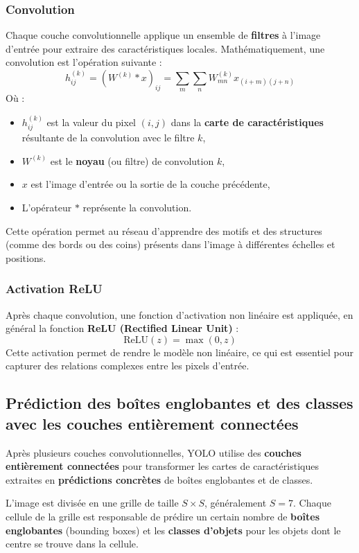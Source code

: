 \documentclass[a4paper,12pt]{article}
\begin{document}
\subsubsection{Convolution}
Chaque couche convolutionnelle applique un ensemble de \textbf{filtres} à l'image d'entrée pour extraire des caractéristiques locales. Mathématiquement, une convolution est l'opération suivante :
\[
h_{ij}^{(k)} = (W^{(k)} * x)_{ij} = \sum_m \sum_n W_{mn}^{(k)} x_{(i+m)(j+n)}
\]
Où :
\begin{itemize}
    \item \( h_{ij}^{(k)} \) est la valeur du pixel \( (i, j) \) dans la \textbf{carte de caractéristiques} résultante de la convolution avec le filtre \( k \),
    \item \( W^{(k)} \) est le \textbf{noyau} (ou filtre) de convolution \( k \),
    \item \( x \) est l'image d'entrée ou la sortie de la couche précédente,
    \item L’opérateur \( * \) représente la convolution.
\end{itemize}

Cette opération permet au réseau d'apprendre des motifs et des structures (comme des bords ou des coins) présents dans l'image à différentes échelles et positions.

\subsubsection{Activation ReLU}
Après chaque convolution, une fonction d'activation non linéaire est appliquée, en général la fonction \textbf{ReLU (Rectified Linear Unit)} :
\[
\text{ReLU}(z) = \max(0, z)
\]
Cette activation permet de rendre le modèle non linéaire, ce qui est essentiel pour capturer des relations complexes entre les pixels d'entrée.

\subsection{Prédiction des boîtes englobantes et des classes avec les couches entièrement connectées}

Après plusieurs couches convolutionnelles, YOLO utilise des \textbf{couches entièrement connectées} pour transformer les cartes de caractéristiques extraites en \textbf{prédictions concrètes} de boîtes englobantes et de classes. 

L'image est divisée en une grille de taille \( S \times S \), généralement \( S = 7 \). Chaque cellule de la grille est responsable de prédire un certain nombre de \textbf{boîtes englobantes} (bounding boxes) et les \textbf{classes d'objets} pour les objets dont le centre se trouve dans la cellule.
\end{document}
